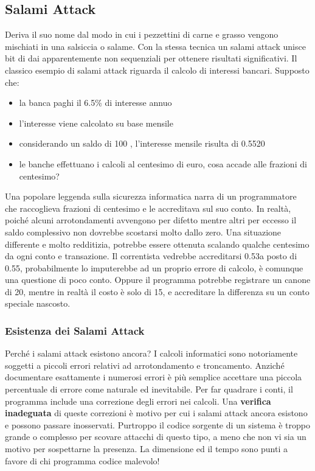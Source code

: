\subsection{Salami Attack}
Deriva il suo nome dal modo in cui i pezzettini di carne e grasso vengono mischiati in una salsiccia o salame. Con la stessa tecnica un salami attack unisce bit di dai apparentemente non sequenziali per ottenere risultati significativi.
Il classico esempio di salami attack riguarda il calcolo di interessi bancari. Supposto che:
\begin{itemize}
	\item la banca paghi il 6.5\% di interesse annuo
	\item l'interesse viene calcolato su base mensile
	\item considerando un saldo di 100 \officialeuro, l'interesse mensile risulta di 0.5520 \officialeuro
	\item le banche effettuano i calcoli al centesimo di euro, cosa accade alle frazioni di centesimo?
\end{itemize}
Una popolare leggenda sulla sicurezza informatica narra di un programmatore che raccoglieva frazioni di centesimo e le accreditava sul suo conto.
In realtà, poiché alcuni arrotondamenti avvengono per difetto mentre altri per eccesso il saldo complessivo non dovrebbe scostarsi molto dallo zero.
\newline
Una situazione differente e molto redditizia, potrebbe essere ottenuta scalando qualche centesimo da ogni conto e transazione. Il correntista vedrebbe accreditarsi 0.53\officialeuro a posto di 0.55\officialeuro, probabilmente lo imputerebbe ad un proprio errore di calcolo, è comunque una questione di poco conto.
Oppure il programma potrebbe registrare un canone di 20\officialeuro, mentre in realtà il costo è solo di 15\officialeuro, e accreditare la differenza su un conto speciale nascosto.
\subsubsection{Esistenza dei Salami Attack}
Perché i salami attack esistono ancora? I calcoli informatici sono notoriamente soggetti a piccoli errori relativi ad arrotondamento e troncamento. Anziché documentare esattamente i numerosi errori è più semplice accettare una piccola percentuale di errore come naturale ed inevitabile. 
Per far quadrare i conti, il programma include una correzione degli errori nei calcoli. Una \textbf{verifica inadeguata} di queste correzioni è motivo per cui i salami attack ancora esistono e possono passare inosservati. 
Purtroppo il codice sorgente di un sistema è troppo grande o complesso per scovare attacchi di questo tipo, a meno che non vi sia un motivo per sospettarne la presenza. La dimensione ed il tempo sono punti a favore di chi programma codice malevolo!